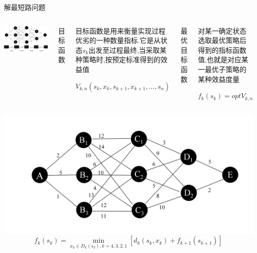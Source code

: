 \begin{frame}{解最短路问题}
    \begin{columns}
            \includegraphics[width=\textwidth]{fig/4-1.png}
            \begin{enumerate}[(6)]
                \scriptsize{\item 目标函数}
            \end{enumerate}
            \begin{itemize}
                \scriptsize{\item 目标函数是用来衡量实现过程优劣的一种数量指标.它是从状态$s_k$出发至过程最终,当采取某种策略时,按预定标准得到的效益值}
                \item $V_{k,n}(s_k,x_k,s_{k+1},x_{k+1},...,s_n)$
            \end{itemize}
            \pause
            \begin{enumerate}[(7)]
                \scriptsize{\item 最优目标函数}
            \end{enumerate}
            \begin{itemize}
                \scriptsize{\item 对某一确定状态选取最优策略后得到的指标函数值,也就是对应某一最优子策略的某种效益度量}
                \item $f_k(s_k)=optV_{k,n}$
            \end{itemize}
    \end{columns}
\end{frame}
\begin{frame}
    \includegraphics[width=\textwidth]{fig/dp0.png}
    $$f_k(s_k)=\min \limits_{x_k\in D_k(s_k),k=4,3,2,1} [d_k(s_k,x_k)+f_{k+1}(s_{k+1})]$$
\end{frame}
